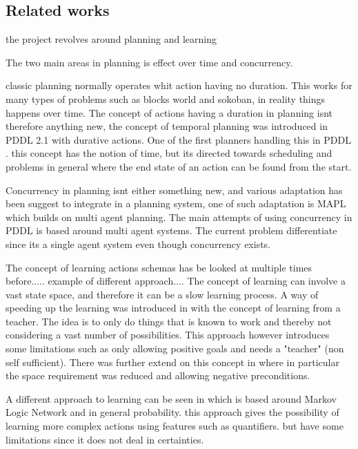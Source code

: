 \subsection{Related works}
the project revolves around planning and learning

The two main areas in planning is effect over time and concurrency. 

classic planning normally operates whit action having no duration. This works for many types of problems such as blocks world and sokoban, in reality things happens over time. The concept of actions having a duration in planning isnt therefore anything new, the concept of temporal planning was introduced in PDDL 2.1 with durative actions. One of the first planners handling this in PDDL \cite{durative}. this concept has the notion of time, but its directed towards scheduling and problems in general where the end state of an action can be found from the start.
%
%	
%
%	
%	




Concurrency in planning isnt either something new, and various adaptation has been suggest to integrate in a planning system, one of such adaptation is MAPL which builds on multi agent planning\cite{mapl}. The main attempts of using concurrency in PDDL is based around multi agent systems. The current problem differentiate since its a single agent system even though concurrency exists. 

The concept of learning actions schemas has be looked at multiple times before..... example of different approach....
The concept of learning can involve a vast state space, and therefore it can be a slow learning process. A way of speeding up the learning was introduced in \cite{Action-Schemas} with the concept of learning from a teacher. The idea is to only do things that is known to work and thereby not considering a vast number of possibilities. This approach however introduces some limitations such as only allowing positive goals and needs a "teacher" (non self sufficient). There was further extend on this concept in \cite{jacobsen2015a} where in particular the space requirement was reduced and allowing negative preconditions.

A different approach to learning can be seen in \cite{zhuo2010a} which is based around Markov Logic Network and in general probability. this approach gives the possibility of learning more complex actions using features such as quantifiers. but have some limitations since it does not deal in certainties.

